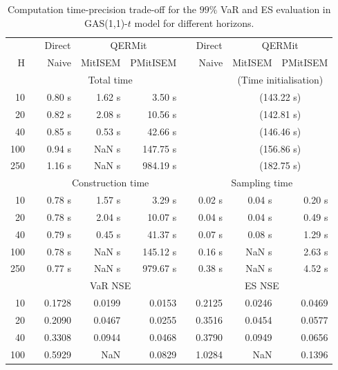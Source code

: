 \footnotesize{  
{ \renewcommand{\arraystretch}{1.3} 
\begin{longtable}{rr rrr r rrr}  
\caption{Computation time-precision trade-off for the  $99\%$ VaR and ES evaluation in GAS(1,1)-$t$ model for different horizons.} 
\label{tab:time_precision_t_gas_ML} \\ 
 & & \multicolumn{1}{c}{Direct} & \multicolumn{2}{c}{QERMit}&  & \multicolumn{1}{c}{Direct} & \multicolumn{2}{c}{QERMit} \\ \cline{3-5} \cline{7-9} 
 H & & Naive & MitISEM & PMitISEM & & Naive & MitISEM & PMitISEM \\ \hline 
 & & \multicolumn{3}{c}{Total time} & & & \multicolumn{2}{c}{(Time initialisation)}  \\ \cline{3-5} \cline{8-9}
10 & & 0.80 s & 1.62 s & 3.50 s &&& \multicolumn{2}{c}{(143.22 s)} \\ 
20 & & 0.82 s & 2.08 s & 10.56 s &&& \multicolumn{2}{c}{(142.81 s)} \\ 
40 & & 0.85 s & 0.53 s & 42.66 s &&& \multicolumn{2}{c}{(146.46 s)} \\ 
100 & & 0.94 s &  NaN s & 147.75 s &&& \multicolumn{2}{c}{(156.86 s)} \\ 
250 & & 1.16 s &  NaN s & 984.19 s &&& \multicolumn{2}{c}{(182.75 s)} \\ 
\hline 
 & & \multicolumn{3}{c}{Construction time} & & \multicolumn{3}{c}{ Sampling time} \\ \cline{3-5}  \cline{7-9}
10 & & 0.78 s & 1.57 s & 3.29 s &&  0.02 s & 0.04 s & 0.20 s \\ 
20 & & 0.78 s & 2.04 s & 10.07 s &&  0.04 s & 0.04 s & 0.49 s \\ 
40 & & 0.79 s & 0.45 s & 41.37 s &&  0.07 s & 0.08 s & 1.29 s \\ 
100 & & 0.78 s &  NaN s & 145.12 s &&  0.16 s &  NaN s & 2.63 s \\ 
250 & & 0.77 s &  NaN s & 979.67 s &&  0.38 s &  NaN s & 4.52 s \\ 
\hline 
 & & \multicolumn{3}{c}{VaR NSE} &&  \multicolumn{3}{c}{ES NSE} \\ \cline{3-5}  \cline{7-9}
10 && 0.1728  & 0.0199  & 0.0153 && 0.2125  & 0.0246  & 0.0469  \\ 
20 && 0.2090  & 0.0467  & 0.0255 && 0.3516  & 0.0454  & 0.0577  \\ 
40 && 0.3308  & 0.0944  & 0.0468 && 0.3790  & 0.0949  & 0.0656  \\ 
100 && 0.5929  &    NaN  & 0.0829 && 1.0284  &    NaN  & 0.1396  \\ 

\end{longtable}}}
